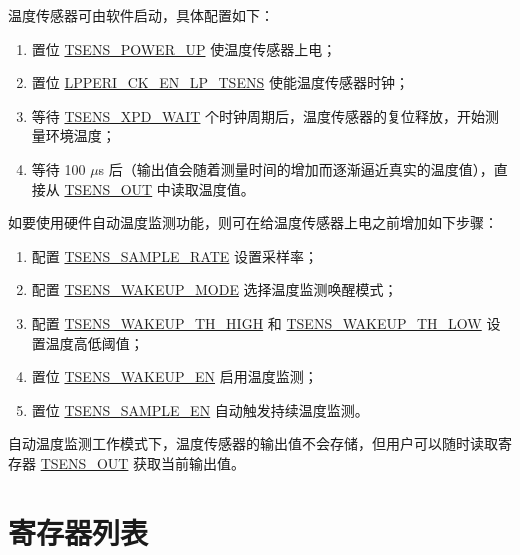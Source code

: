 \documentclass[main\_\_CN.tex]{subfiles}
\begin{document}
温度传感器可由软件启动，具体配置如下：
    \begin{enumerate}
        \item 置位 \hyperref[fielddesc:TSENSPOWERUP]{TSENS\_POWER\_UP} 使温度传感器上电；
        \item 置位 \hyperref[fielddesc:LPPERICKENLPTSENS]{LPPERI\_CK\_EN\_LP\_TSENS} 使能温度传感器时钟；
        \item 等待 \hyperref[fielddesc:TSENSXPDWAIT]{TSENS\_XPD\_WAIT} 个时钟周期后，温度传感器的复位释放，开始测量环境温度；
        \item 等待 100 $\mu$s 后（输出值会随着测量时间的增加而逐渐逼近真实的温度值），直接从 \hyperref[fielddesc:TSENSOUT]{TSENS\_OUT} 中读取温度值。
    \end{enumerate}

如要使用硬件自动温度监测功能，则可在给温度传感器上电之前增加如下步骤：
    \begin{enumerate}
        \item 配置 \hyperref[fielddesc:TSENSSAMPLERATE]{TSENS\_SAMPLE\_RATE} 设置采样率；
        \item 配置 \hyperref[fielddesc:TSENSWAKEUPMODE]{TSENS\_WAKEUP\_MODE} 选择温度监测唤醒模式；
        \item 配置 \hyperref[fielddesc:TSENSWAKEUPTHHIGH]{TSENS\_WAKEUP\_TH\_HIGH} 和 \hyperref[fielddesc:TSENSWAKEUPTHLOW]{TSENS\_WAKEUP\_TH\_LOW} 设置温度高低阈值；
        \item 置位 \hyperref[fielddesc:TSENSWAKEUPEN]{TSENS\_WAKEUP\_EN} 启用温度监测；
        \item 置位 \hyperref[fielddesc:TSENSSAMPLEEN]{TSENS\_SAMPLE\_EN} 自动触发持续温度监测。
    \end{enumerate}

自动温度监测工作模式下，温度传感器的输出值不会存储，但用户可以随时读取寄存器 \hyperref[fielddesc:TSENSOUT]{TSENS\_OUT} 获取当前输出值。





\newpage
\hypertarget{tmpsen-reg-summ}{}
\section{寄存器列表}
\label{sec:tmpsen-reg-summ}
\end{document}
